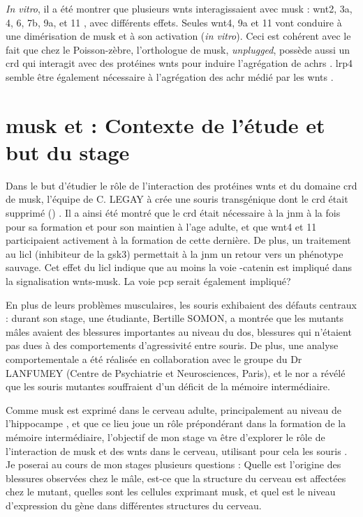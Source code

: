 	\emph{In vitro}, il a été montrer que plusieurs \Glspl{wnt} interagissaient avec \gls{musk} : \Gls{wnt}2, 3a, 4, 6, 7b, 9a, et 11 \cite{Strochlic2012, Zhang2012, Barik2014}, avec différents effets. Seules \gls{wnt}4, 9a et 11 vont conduire à une dimérisation de \gls{musk} et à son activation (\emph{in vitro}). Ceci est cohérent avec le fait que chez le Poisson-zèbre, l'orthologue de \gls{musk}, \emph{unplugged}, possède aussi un \gls{crd} qui interagit avec des protéines \Glspl{wnt} pour induire l'agrégation de \glspl{achr} \cite{Jing2009, Gordon2012}. \Gls{lrp}4 semble être également nécessaire à l'agrégation des \gls{achr} médié par les \gls{wnt}s \cite{Zhang2012}.

\section{\acrshort{musk} et  : Contexte de l'étude et but du stage}
\label{sec:Contexte}	
	Dans le but d'étudier le rôle de l'interaction des protéines \Glspl{wnt} et du domaine \gls{crd} de \gls{musk}, l'équipe de C. LEGAY à crée une souris transgénique dont le \gls{crd} était supprimé (\mcrd) \cite{Messeant2015, Messeant2017}. Il a ainsi été montré que le \gls{crd} était nécessaire à la \gls{jnm} à la fois pour sa formation et pour son maintien à l'age adulte, et que \Gls{wnt}4 et 11 participaient activement à la formation de cette dernière. De plus, un traitement au \gls{licl} (inhibiteur de la \gls{gsk3}) permettait à la \gls{jnm} un retour vers un phénotype sauvage. Cet effet du \gls{licl} indique que au moins la voie \textbeta{}-catenin est impliqué dans la signalisation \Glspl{wnt}-\gls{musk}. La voie \gls{pcp} serait également impliqué?
	
	En plus de leurs problèmes musculaires, les souris \mcrd exhibaient des défauts centraux : durant son stage, une étudiante, Bertille SOMON, a montrée que les mutants mâles avaient des blessures importantes au niveau du dos, blessures qui n'étaient pas dues à des comportements d'agressivité entre souris. De plus, une analyse comportementale a été réalisée en collaboration avec le groupe du Dr LANFUMEY (Centre de Psychiatrie et Neurosciences, Paris), et le \gls{nor} a révélé que les souris mutantes souffraient d'un déficit de la mémoire intermédiaire.
	
	Comme \gls{musk} est exprimé dans le cerveau adulte, principalement au niveau de l'hippocampe \cite{Garcia-Osta2006}, et que ce lieu joue un rôle prépondérant dans la formation de la mémoire intermédiaire, l'objectif de mon stage va être d'explorer le rôle de l'interaction de \gls{musk} et des \Glspl{wnt} dans le cerveau, utilisant pour cela les souris \mcrd. Je poserai au cours de mon stages plusieurs questions : Quelle est l'origine des blessures observées chez le mâle, est-ce que la structure du cerveau est affectées chez le mutant, quelles sont les cellules exprimant \gls{musk}, et quel est le niveau d'expression du gène dans différentes structures du cerveau.